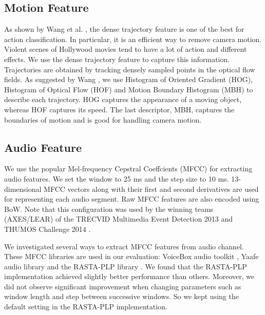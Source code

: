 \subsection{Motion Feature}
As shown by Wang et al. \cite{wang2013action}, the dense trajectory feature is one of the best for action classification. In particular, it is an efficient way to remove camera motion. Violent scenes of Hollywood movies tend to have a lot of action and different effects. We use the dense trajectory feature to capture this information. Trajectories are obtained by tracking densely sampled points in the optical flow fields. As suggested by Wang \cite{wang2013action}, we use Histogram of Oriented Gradient (HOG), Histogram of Optical Flow (HOF) and Motion Boundary Histogram (MBH) to describe each trajectory. HOG captures the appearance of a moving object, whereas HOF captures its speed. The last descriptor, MBH, captures the boundaries of motion and is good for handling camera motion.


\subsection{Audio Feature}
We use the popular Mel-frequency Cepstral Coeffcients (MFCC) \cite{rabiner2007introduction} for extracting audio features. We set the window to 25 ms and the step size to 10 ms. 13-dimensional MFCC vectors along with their first and second derivatives are used for representing each audio segment. Raw MFCC features are also encoded using BoW. Note that this configuration was used by the winning teams (AXES/LEAR) of the TRECVID Multimedia Event Detection 2013 \cite{aly2013axes} and THUMOS Challenge 2014 \cite{oneata2014lear}.

We investigated several ways to extract MFCC features from audio channel. These MFCC libraries are used in our evaluation: VoiceBox audio toolkit \cite{voicebox}, Yaafe audio library \cite{mathieu2010yaafe} and the RASTA-PLP library \cite{Ellis05-rastamat}. We found that the RASTA-PLP implementation achieved slightly better performance than others. Moreover, we did not observe significant improvement when changing parameters such as window length and step between successive windows. So we kept using the default setting in the RASTA-PLP implementation.

